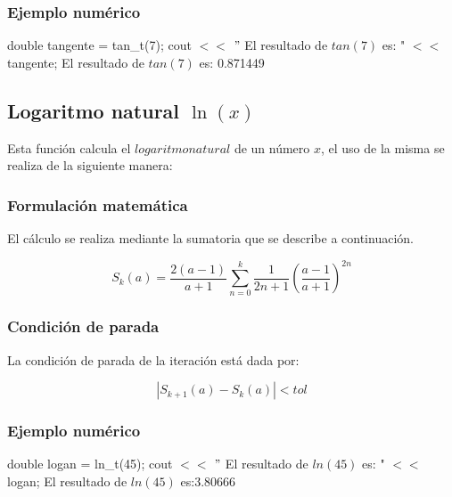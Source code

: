 \documentclass[10pt,a4paper]{article}
\begin{document}
	\subsubsection{Ejemplo numérico}

	double tangente = tan{\_}t(7); \newline
	cout $<<$ $"$ El resultado de $tan(7)$ es: " $<<$ tangente; \newline
	El resultado de $tan(7)$ es: 0.871449\newline
	
	\subsection{Logaritmo natural $\ln(x)$}
	
	Esta función calcula el $logaritmo natural$ de un número $x$, el uso de la misma se realiza de la siguiente manera:
	
	\begin{center}
	\end{center}
	
	\subsubsection{Formulación matemática}
	
	El cálculo se realiza mediante la sumatoria que se describe a continuación.
	
	\begin{equation}\label{key11}
		S_{k}(a) = \frac{2(a-1)}{a + 1}\sum_{n=0}^{k}\frac{1}{2n + 1}\left(\frac{a - 1}{a + 1}\right)^{2n}
	\end{equation}
	
	\subsubsection{Condición de parada}
	
	La condición de parada de la iteración está dada por: 
	
	\begin{equation}\label{key12}
		\left\lvert S_{k+1}(a) - S_{k}(a) \right\lvert < tol
	\end{equation}
	
	\subsubsection{Ejemplo numérico}

	double logan = ln{\_}t(45); \newline
	cout $<<$ $"$ El resultado de $ln(45)$ es: " $<<$ logan; \newline
	El resultado de $ln(45)$ es:3.80666\newline
	
\end{document}
